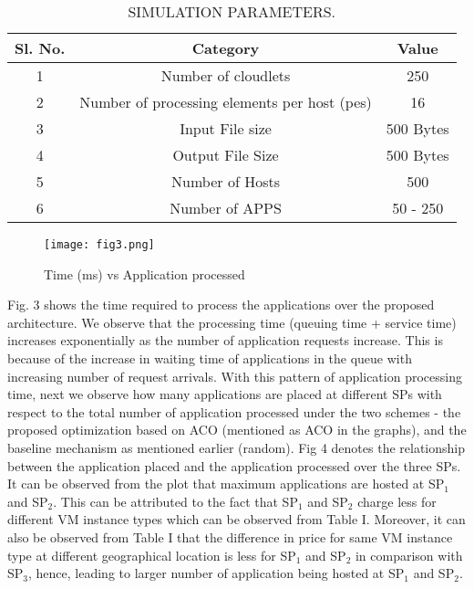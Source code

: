 \documentclass[conference]{IEEEtran}
\newcommand\tab[1][0.8cm]{\hspace*{#1}}
\begin{document}
\begin{table}[htbp!]
	\caption{SIMULATION PARAMETERS.}
	\begin{center}
		\begin{tabular}{|c|c|c|}
			\hline
		Sl. No. & Category & Value\\
			\hline
		1 & Number of cloudlets& 250 \\
			\hline
			2 & Number of processing elements per host (pes) & 16\\
			\hline
			3 & Input File size & 500 Bytes \\
			\hline
				4 & Output File Size & 500 Bytes \\
			
			\hline
			5 & Number of Hosts & 500  \\
			\hline
			6 & Number of APPS & 50 - 250 \\
			\hline
			
		\end{tabular}
		\label{tab1}
	\end{center}
\end{table}
\begin{figure}[htbp]
	\centerline{\texttt{[image: fig3.png]}}
	\caption{Time (ms) vs Application processed}
	\label{fig}
\end{figure}
\tab Fig. 3 shows the time required to process the applications
over the proposed architecture. We observe that the processing
time (queuing time + service time) increases exponentially as
the number of application requests increase. This is because
of the increase in waiting time of applications in the queue
with increasing number of request arrivals. With this pattern
of application processing time, next we observe how many
applications are placed at different SPs with respect to the
total number of application processed under the two schemes
- the proposed optimization based on ACO (mentioned as
ACO in the graphs), and the baseline mechanism as mentioned
earlier (random). Fig 4 denotes the relationship between the
application placed and the application processed over the
three SPs. It can be observed from the plot that maximum
applications are hosted at SP$_1$ and SP$_2$. This can be attributed
to the fact that SP$_1$ and SP$_2$ charge less for different VM
instance types which can be observed from Table I. Moreover,
it can also be observed from Table I that the difference in price
for same VM instance type at different geographical location is
less for SP$_1$ and SP$_2$ in comparison with SP$_3$, hence, leading
to larger number of application being hosted at SP$_1$ and SP$_2$.
\end{document}
